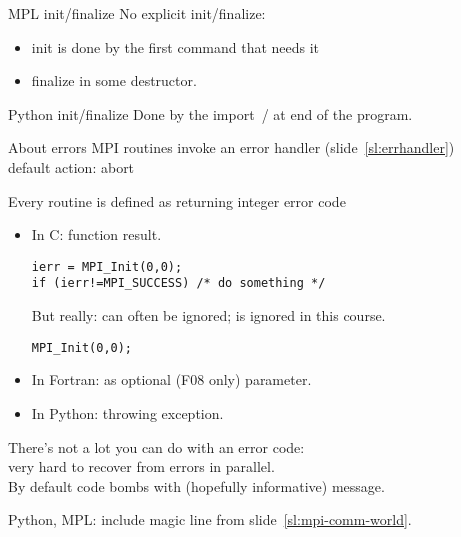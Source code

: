 \begin{mpl}
  \addtocounter{slidecount}{-1}
\begin{numberedframe}{MPL init/finalize}
    No explicit init/finalize:
    \begin{itemize}
    \item init is done by the first command that needs it
    \item finalize in some destructor.
    \end{itemize}
\end{numberedframe}
\end{mpl}

\begin{python}
  \addtocounter{slidecount}{-1}
\begin{numberedframe}{Python init/finalize}
    Done by the import~/ at end of the program.
\end{numberedframe}
\end{python}

\begin{numberedframe}{About errors}
  MPI routines invoke an error handler (slide~\ref{sl:errhandler})\\
  default action: abort
  
  Every routine is defined as returning integer error code
  \begin{itemize}
  \item In C: function result. 
\lstset{language=C++}
\begin{lstlisting}
ierr = MPI_Init(0,0);
if (ierr!=MPI_SUCCESS) /* do something */
\end{lstlisting}
  But really: can often be ignored; is ignored in this course.
\begin{lstlisting}
MPI_Init(0,0);
\end{lstlisting}
  \item In Fortran: as optional (F08 only) parameter.
  \item In Python: throwing exception.
  \end{itemize}
  There's not a lot you can do with an error code:\\
  very hard to recover from errors in parallel.\\
  By default code bombs with (hopefully informative) message.
\end{numberedframe}

\begin{exerciseframe}[hello]
  

  Python, MPL: include magic line from slide~\ref{sl:mpi-comm-world}.
\end{exerciseframe}

